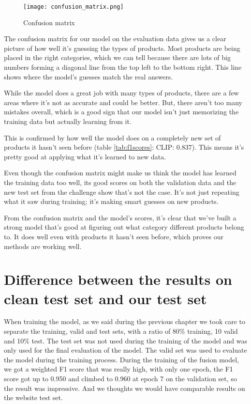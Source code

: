 \begin{figure}[H]
	\centering
	\texttt{[image: confusion\_matrix.png]}
	\caption{Confusion matrix}
	\label{fig:confusionmatrix}
\end{figure}

The confusion matrix for our model on the evaluation data gives us a clear picture of how well it's guessing the types of products. Most products are being placed in the right categories, which we can tell because there are lots of big numbers forming a diagonal line from the top left to the bottom right. This line shows where the model's guesses match the real answers.

While the model does a great job with many types of products, there are a few areas where it's not as accurate and could be better. But, there aren't too many mistakes overall, which is a good sign that our model isn't just memorizing the training data but actually learning from it.

This is confirmed by how well the model does on a completely new set of products it hasn't seen before (table \ref*{tab:f1scores}: CLIP: 0.837). This means it's pretty good at applying what it's learned to new data.

Even though the confusion matrix might make us think the model has learned the training data too well, its good scores on both the validation data and the new test set from the challenge show that's not the case. It's not just repeating what it saw during training; it's making smart guesses on new products.

From the confusion matrix and the model's scores, it's clear that we've built a strong model that's good at figuring out what category different products belong to. It does well even with products it hasn't seen before, which proves our methods are working well.


\section{Difference between the results on clean test set and our test set}
When training the model, as we said during the previous chapter we took care
to separate the training, valid and test sets, with a ratio of 80\% training, 10%
valid and 10\% test. The test set was not used during the training of the model
and was only used for the final evaluation of the model. The valid set was used
to evaluate the model during the training process. During the training of the
fusion model, we got a weighted F1 score that was really high, with only one
epoch, the F1 score got up to 0.950 and climbed to 0.960 at epoch 7 on the
validation set, so the result was impressive. And we thoughts we would have
comparable results on the website test set.

